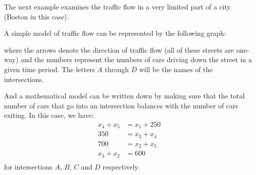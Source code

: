 The next example examines the traffic flow in a very limited part of a city (Boston in this case).  

\begin{example} \label{ex:traffic}

A simple model of traffic flow can be represented by the following graph:

\begin{center}
\end{center}
where the arrows denote the direction of traffic flow (all of these streets are one-way) and the numbers represent the numbers of cars driving down the street in a given time period.  The letters $A$ through $D$ will be the names of the intersections.   

And a mathematical model can be written down by making sure that the total number of cars that go into an intersection balances with the number of cars exiting.  In this case, we have:
%
\begin{align*}
x_4 + x_5 & = x_1 + 250\\ 
350 & = x_3 + x_4 \\
700 & = x_2 + x_5 \\
x_3 + x_2 & =  600 \\
\end{align*}
for intersections $A$, $B$, $C$ and $D$ respectively. 
\end{example}

